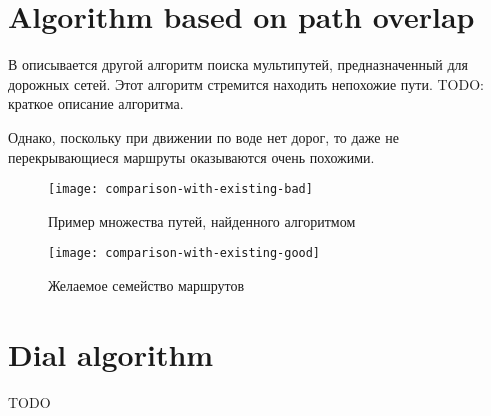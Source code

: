 \section{Algorithm based on path overlap}

В \cite{Hyunmyung} описывается другой алгоритм поиска мультипутей,
предназначенный для дорожных сетей. Этот алгоритм стремится находить
непохожие пути. TODO: краткое описание алгоритма.

Однако, поскольку при движении по воде нет дорог, то даже не
перекрывающиеся маршруты оказываются очень похожими.

\begin{figure}
    \texttt{[image: comparison-with-existing-bad]}
    \caption{Пример множества путей, найденного алгоритмом}
\end{figure}

\begin{figure}
    \texttt{[image: comparison-with-existing-good]}
    \caption{Желаемое семейство маршрутов}
\end{figure}

\FloatBarrier

\section{Dial algorithm}

TODO

\FloatBarrier

